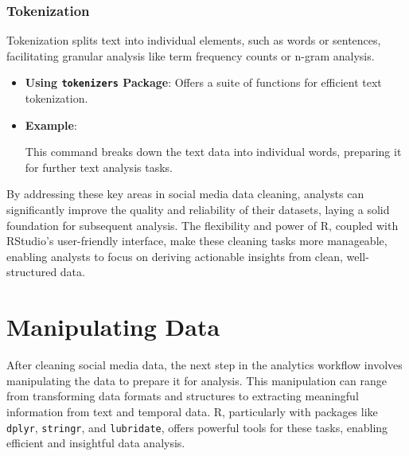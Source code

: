 \documentclass[
]{book}
\newenvironment{Shaded}{\begin{snugshade}}{\end{snugshade}}
\newcommand{\FunctionTok}[1]{\textcolor[rgb]{0.13,0.29,0.53}{\textbf{#1}}}
\newcommand{\NormalTok}[1]{#1}
\newcommand{\OtherTok}[1]{\textcolor[rgb]{0.56,0.35,0.01}{#1}}
\newcommand{\SpecialCharTok}[1]{\textcolor[rgb]{0.81,0.36,0.00}{\textbf{#1}}}
\begin{document}
\hypertarget{tokenization}{%
\subsubsection{Tokenization}\label{tokenization}}

Tokenization splits text into individual elements, such as words or sentences, facilitating granular analysis like term frequency counts or n-gram analysis.

\begin{itemize}
\item
  \textbf{Using \texttt{tokenizers} Package}: Offers a suite of functions for efficient text tokenization.
\item
  \textbf{Example}:

\begin{Shaded}
\end{Shaded}

  This command breaks down the text data into individual words, preparing it for further text analysis tasks.
\end{itemize}

By addressing these key areas in social media data cleaning, analysts can significantly improve the quality and reliability of their datasets, laying a solid foundation for subsequent analysis. The flexibility and power of R, coupled with RStudio's user-friendly interface, make these cleaning tasks more manageable, enabling analysts to focus on deriving actionable insights from clean, well-structured data.

\hypertarget{manipulating-data}{%
\section{Manipulating Data}\label{manipulating-data}}

After cleaning social media data, the next step in the analytics workflow involves manipulating the data to prepare it for analysis. This manipulation can range from transforming data formats and structures to extracting meaningful information from text and temporal data. R, particularly with packages like \texttt{dplyr}, \texttt{stringr}, and \texttt{lubridate}, offers powerful tools for these tasks, enabling efficient and insightful data analysis.
\end{document}
